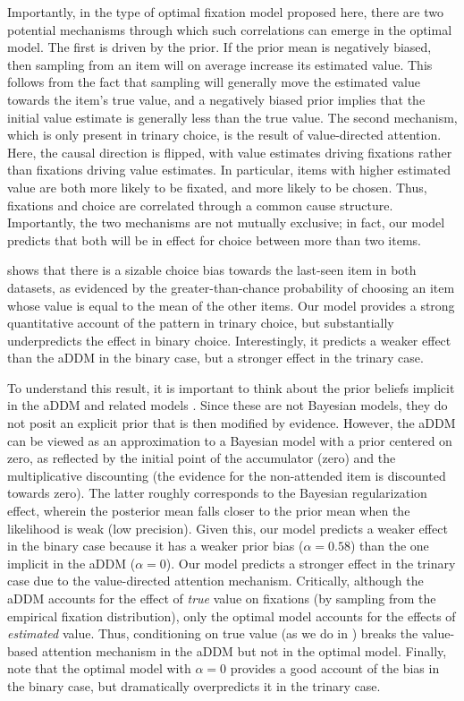 Importantly, in the type of optimal fixation model proposed here, there are two potential mechanisms through which such correlations can emerge in the optimal model. The first is driven by the prior. If the prior mean is negatively biased, then sampling from an item will on average increase its estimated value. This follows from the fact that sampling will generally move the estimated value towards the item's true value, and a negatively biased prior implies that the initial value estimate is generally less than the true value. The second mechanism, which is only present in trinary choice, is the result of value-directed attention. Here, the causal direction is flipped, with value estimates driving fixations rather than fixations driving value estimates. In particular, items with higher estimated value are both more likely to be fixated, and more likely to be chosen. Thus, fixations and choice are correlated through a common cause structure. Importantly, the two mechanisms are not mutually exclusive; in fact, our model predicts that both will be in effect for choice between more than two items.

 shows that there is a sizable choice bias towards the last-seen item in both datasets, as evidenced by the greater-than-chance probability of choosing an item whose value is equal to the mean of the other items. Our model provides a strong quantitative account of the pattern in trinary choice, but substantially underpredicts the effect in binary choice. Interestingly, it predicts a weaker effect than the aDDM in the binary case, but a stronger effect in the trinary case. 

To understand this result, it is important to think about the prior beliefs implicit in the aDDM and related models \citep{krajbich2010visual,krajbich2011multialternative,gluth2020valuebased}. Since these are not Bayesian models, they do not posit an explicit prior that is then modified by evidence. However, the aDDM can be viewed as an approximation to a Bayesian model with a prior centered on zero, as reflected by the initial point of the accumulator (zero) and the multiplicative discounting (the evidence for the non-attended item is discounted towards zero). The latter roughly corresponds to the Bayesian regularization effect, wherein the posterior mean falls closer to the prior mean when the likelihood is weak (low precision). Given this, our model predicts a weaker effect in the binary case because it has a weaker prior bias ($\alpha = 0.58$) than the one implicit in the aDDM ($\alpha = 0$). Our model predicts a stronger effect in the trinary case due to the value-directed attention mechanism. Critically, although the aDDM accounts for the effect of \emph{true} value on fixations (by sampling from the empirical fixation distribution), only the optimal model accounts for the effects of \emph{estimated} value. Thus, conditioning on true value (as we do in ) breaks the value-based attention mechanism in the aDDM but not in the optimal model. Finally, note that the optimal model with $\alpha = 0$ provides a good account of the bias in the binary case, but dramatically overpredicts it in the trinary case.

